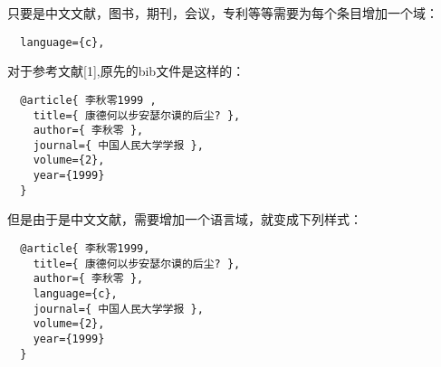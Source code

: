 只要是中文文献，图书，期刊，会议，专利等等需要为每个条目增加一个域：
\begin{lstlisting}
  language={c},
\end{lstlisting}

对于参考文献[1],原先的bib文件是这样的：
\begin{lstlisting}
  @article{ 李秋零1999 ,
    title={ 康德何以步安瑟尔谟的后尘? },
    author={ 李秋零 },
    journal={ 中国人民大学学报 },
    volume={2},
    year={1999}
  }
\end{lstlisting}


但是由于是中文文献，需要增加一个语言域，就变成下列样式：
\begin{lstlisting}
  @article{ 李秋零1999,
    title={ 康德何以步安瑟尔谟的后尘? },
    author={ 李秋零 },
    language={c},
    journal={ 中国人民大学学报 },
    volume={2},
    year={1999}
  }
\end{lstlisting}
